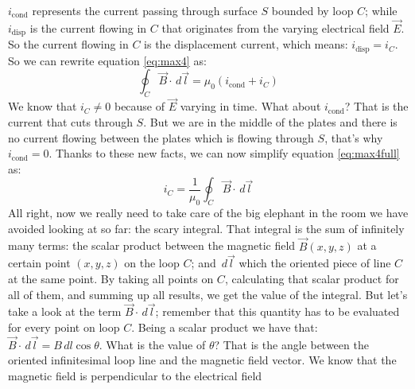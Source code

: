 $i_{\text{cond}}$ represents the current passing through surface $S$ bounded by loop $C$;
while $i_{\text{disp}}$ is the current flowing in $C$ that originates from
the varying electrical field $\vec{E}$. So the current flowing in $C$ is the
displacement current, which means: $i_{\text{disp}} = i_C$.
So we can rewrite equation \ref{eq:max4} as:
\begin{equation}
    \label{eq:max4full}
    \oint_C \vec{B} \cdot \,d \vec{l} = \mu_0 (i_{\text{cond}} + i_C)
\end{equation}
We know that $i_C \neq 0$ because of $\vec{E}$ varying
in time. What about $i_{\text{cond}}$? That is the current that cuts through $S$. But
we are in the middle of the plates and there is no current flowing between the plates
which is flowing through $S$, that's why $i_{\text{cond}} = 0$. Thanks to these new
facts, we can now simplify equation \ref{eq:max4full} as:
\begin{equation}
    \label{eq:max4slim}
    i_C = \frac{1}{\mu_0}\oint_C \vec{B} \cdot \,d \vec{l}
\end{equation}
All right, now we really need to take care of the big elephant in the room we have
avoided looking at so far: the scary integral.
That integral is the sum of infinitely many terms: the scalar product between
the magnetic field $\vec{B}(x,y,z)$ at a certain point $(x,y,z)$ on the
loop $C$; and $\,d \vec{l}$ which the oriented piece of line $C$ at the same point.
By taking all points on $C$, calculating that scalar product for all of them, and
summing up all results, we get the value of the integral. But let's take a look at the
term $\vec{B} \cdot \,d \vec{l}$; remember that this quantity has to be evaluated for
every point on loop $C$. Being a scalar
product
we have that:
$\vec{B} \cdot \,d \vec{l} = B \,d l \cos\theta$.
What is the value of $\theta$? That is the angle between the oriented infinitesimal
loop line and the magnetic field vector. We know that the magnetic field is
perpendicular to the
electrical field
